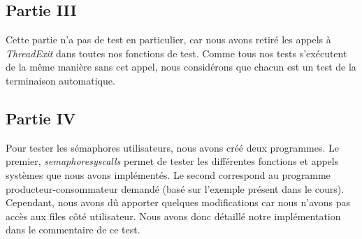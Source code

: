 \documentclass{article}
\begin{document}
\subsection{Partie III}
Cette partie n'a pas de test en particulier, car nous avons retiré les appels à \textit{ThreadExit} dans toutes nos fonctions de test.
Comme tous nos tests s'exécutent de la même manière sans cet appel, nous considérons que chacun est un test de la terminaison automatique.

\subsection{Partie IV}
Pour tester les sémaphores utilisateurs, nous avons créé deux programmes. Le premier, \textit{semaphoresyscalls} permet de tester
les différentes fonctions et appels systèmes que nous avons implémentés. Le second correspond au programme producteur-consommateur 
demandé (basé sur l'exemple présent dans le cours). Cependant, nous avons dû apporter quelques modifications car nous n'avons pas 
accès aux files côté utilisateur. Nous avons donc détaillé notre implémentation dans le commentaire de ce test.
\end{document}
